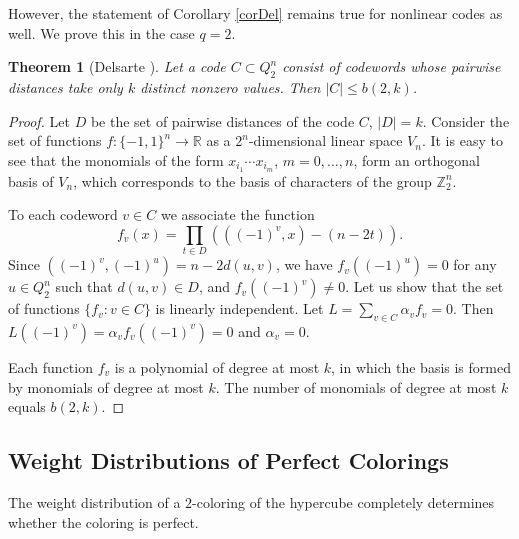 \documentclass[11pt]{article}
\newtheorem{theorem}{Theorem}[section]
\theoremstyle{definition}
\begin{document}
{{{However, the statement of Corollary \ref{corDel} remains true for nonlinear codes as well. We prove this in the case $q=2$.

\begin{theorem}[Delsarte \cite{Delsarte73}]
Let a code $C\subset Q^n_2$ consist of codewords whose pairwise distances take only $k$ distinct nonzero values. Then $|C|\leq b(2,k)$.
\end{theorem}
\begin{proof}
Let $D$ be the set of pairwise distances of the code $C$, $|D|=k$. Consider the set of functions $f:\{-1,1\}^n\rightarrow\mathbb{R}$ as a $2^n$-dimensional linear space $V_n$. It is easy to see that the monomials of the form $x_{i_1}\cdots x_{i_m}$, $m=0,\dots,n$, form an orthogonal basis of $V_n$, which corresponds to the basis of characters of the group $\mathbb{Z}_2^n$.

To each codeword $v\in C$ we associate the function $$f_v(x)=\prod\limits_{t\in D}(((-1)^v,x)-(n-2t)).$$ Since $((-1)^v,(-1)^u)=n-2d(u,v)$, we have $f_v((-1)^u)=0$ for any $u\in Q^n_2$ such that $d(u,v)\in D$, and $f_v((-1)^v)\neq 0$. Let us show that the set of functions $\{f_v : v\in C\}$ is linearly independent. Let $L=\sum\limits_{v\in C}\alpha_vf_v=0$. Then $L((-1)^v)=\alpha_vf_v((-1)^v)= 0$ and $\alpha_v=0$.

Each function $f_v $ is a polynomial  of degree at most $k$, in which the basis is formed by monomials of degree at most $k$.  The number of monomials of degree at most $k$ equals  $b(2,k)$.
\end{proof}



\subsection{Weight Distributions of Perfect Colorings}

The weight distribution of a $2$-coloring of the hypercube completely determines whether the coloring is perfect.

}}}
\end{document}
